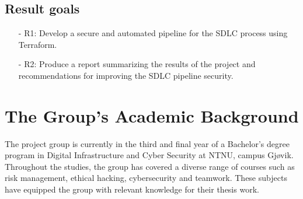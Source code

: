 \subsection{Result goals}
\begin{itemize}
    
    \item[-] R1: Develop a secure and automated pipeline for the SDLC process using Terraform. 
    
    \item[-] R2: Produce a report summarizing the results of the project and recommendations for improving the SDLC pipeline security.
    
\end{itemize}


\section{The Group’s Academic Background}
The project group is currently in the third and final year of a Bachelor's degree program in Digital Infrastructure and Cyber Security at NTNU, campus Gjøvik. Throughout the studies, the group has covered a diverse range of courses such as risk management, ethical hacking, cybersecurity and teamwork. These subjects have equipped the group with relevant knowledge for their thesis work.


